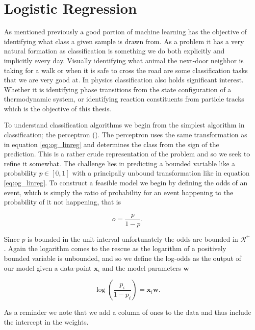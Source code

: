 
\section{Logistic Regression}\label{sec:LogReg}

As mentioned previously a good portion of machine learning has the objective of identifying what class a given sample is drawn from. As a problem it has a very natural formation as classification is something we do both explicitly and implicitly every day. Visually identifying what animal the next-door neighbor is taking for a walk or when it is safe to cross the road are some classification tasks that we are very good at. In physics classification also holds significant interest. Whether it is identifying phase transitions from the state configuration of a thermodynamic system, or identifying reaction constituents from particle tracks which is the objective of this thesis.

To understand classification algorithms we begin from the simplest algorithm in classification; the perceptron (\cite{Rosenblatt1958}). The perceptron uses the same transformation as in equation \ref{eq:og_linreg} and determines the class from the sign of the prediction. This is a rather crude representation of the problem and so we seek to refine it somewhat. The challenge lies in predicting a bounded variable like a probability $p \in [0,1]$ with a principally unbound transformation like in equation \ref{eq:og_linreg}. To construct a feasible model we begin by defining the odds of an event, which is simply the ratio of probability for an event happening to the probability of it not happening, that is 

\begin{equation}\label{eq:odds}
o = \frac{p}{1-p}.
\end{equation}

\noindent Since $p$ is bounded in the unit interval unfortunately the odds are bounded in $\mathcal{R}^+$. Again the logarithm comes to the rescue as the logarithm of a positively bounded variable is unbounded, and so we define the log-odds as the output of our model given a data-point $\mathbf{x}_i$ and the model parameters $\mathbf{w}$

\begin{equation}\label{eq:log_odds}
\log \left(\frac{p_i}{1-p_i}\right) = \mathbf{x}_i\mathbf{w}. 
\end{equation} 

\noindent As a reminder we note that we add a column of ones to the data and thus include the intercept in the weights. 

